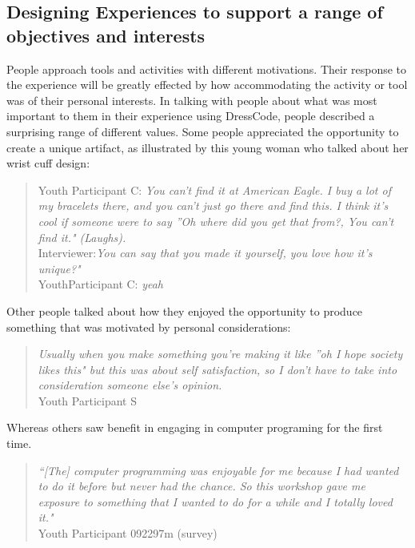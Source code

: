 \documentclass{sigchi}
\begin{document}
\subsection{Designing Experiences to support a range of objectives and interests}
People approach tools and activities with different motivations. %
Their response to the experience will be greatly effected by how accommodating the activity or tool was of their personal interests. In talking with people about what was most important to them in their experience using DressCode, people described a surprising range of different values. Some people appreciated the opportunity to create a unique artifact, as illustrated by this young woman who talked about her wrist cuff design:
\begin{quote}
Youth Participant C: \textit{You can't find it at American Eagle. I buy a lot of my bracelets there, and you can't just go there and find this. I think it's cool if someone were to say ''Oh where did you get that from?, You can't find it." (Laughs).}
\\Interviewer:\textit{You can say that you made it yourself, you love how it's unique?"}
\\YouthParticipant C: \textit{yeah}
\end{quote}

Other people talked about how they enjoyed the opportunity to produce something that was motivated by personal considerations:
\begin{quote}
\textit{Usually when you make something you're making it like ''oh I hope society likes this" but this was about self satisfaction, so I don't have to take into consideration someone else's opinion.}
\\Youth Participant S
\end{quote}

Whereas others saw benefit in engaging in computer programing for the first time.
\begin{quote}
\textit{``[The] computer programming was enjoyable for me because I had wanted to do it before but never had the chance. So this workshop gave me exposure to something that I wanted to do for a while and I totally loved it."}
\\Youth Participant 092297m (survey)
\end{quote}
\end{document}
